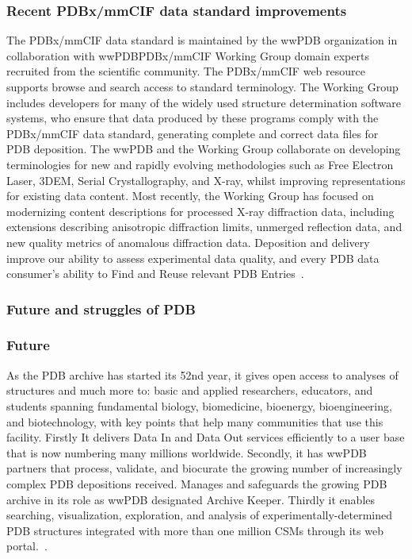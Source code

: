 \documentclass[]{final_report}
\begin{document}
\subsubsection{Recent PDBx/mmCIF data standard improvements}

The PDBx/mmCIF data standard is maintained by the wwPDB organization in collaboration with wwPDBPDBx/mmCIF Working Group domain experts recruited from the scientific community. The PDBx/mmCIF web resource supports browse and search access to standard terminology. The Working Group includes developers for many of the widely used structure determination software systems, who ensure that data produced by these programs comply with the PDBx/mmCIF data standard, generating complete and correct data files for PDB deposition. The wwPDB and the Working Group collaborate on developing terminologies for new and rapidly evolving methodologies such as Free Electron Laser, 3DEM, Serial Crystallography, and X-ray, whilst improving representations for existing data content. Most recently, the Working Group has focused on modernizing content descriptions for processed X-ray diffraction data, including extensions describing anisotropic diffraction limits, unmerged reflection data, and new quality metrics of anomalous diffraction data. Deposition and delivery improve our ability to assess experimental data quality, and every PDB data consumer's ability to Find and Reuse relevant PDB Entries~\cite{burley_rcsb_2022}.

\subsubsection{Future and struggles of PDB}
\subsubsection{Future}
As the PDB archive has started its 52nd year, it gives open access to analyses of structures and much more to: basic and applied researchers, educators, and students spanning fundamental biology, biomedicine, bioenergy, bioengineering, and biotechnology, with key points that help many communities that use this facility. Firstly It delivers Data In and Data Out services efficiently to a user base that is now numbering many millions worldwide. Secondly, it has wwPDB partners that process, validate, and biocurate the growing number of increasingly complex PDB depositions received. Manages and safeguards the growing PDB archive in its role as wwPDB designated Archive Keeper. Thirdly it enables searching, visualization, exploration, and analysis of experimentally-determined PDB structures integrated with more than one million CSMs through its web portal.~\cite{burley1_rcsb_2022}.
\end{document}
